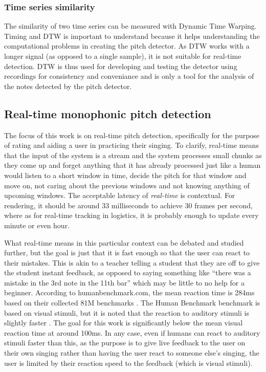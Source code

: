 \subsubsection{Time series similarity}
The similarity of two time series can be measured with Dynamic Time Warping. Timing and DTW is important to understand because it helps understanding the computational problems in creating the pitch detector. As DTW works with a longer signal (as opposed to a single sample), it is not suitable for real-time detection. DTW is thus used for developing and testing the detector using recordings for consistency and conveniance and is only a tool for the analysis of the notes detected by the pitch detector. 

\subsection{Real-time monophonic pitch detection}
The focus of this work is on real-time pitch detection, specifically for the purpose of rating and aiding a user in practicing their singing. To clarify, real-time means that the input of the system is a stream and the system processes small chunks as they come up and forget anything that it has already processed just like a human would listen to a short window in time, decide the pitch for that window and move on, not caring about the previous windows and not knowing anything of upcoming windows. The acceptable latency of \textit{real-time} is contextual. For rendering, it should be around 33 milliseconds to achieve 30 frames per second, where as for real-time tracking in logistics, it is probably enough to update every minute or even hour. 

What real-time means in this particular context can be debated and studied further, but the goal is just that it is fast enough so that the user can react to their mistakes. This is akin to a teacher telling a student that they are off to give the student instant feedback, as opposed to saying something like “there was a mistake in the 3rd note in the 11th bar” which may be little to no help for a beginner. According to humanbenchmark.com, the mean reaction time is 284ms based on their collected 81M benchmarks \cite{HumanBenchmark2025}. The Human Benchmark benchmark is based on visual stimuli, but it is noted that the reaction to auditory stimuli is slightly faster \cite{SheltonKumar2010}. The goal for this work is significantly below the mean visual reaction time at around 100ms. In any case, even if humans can react to auditory stimuli faster than this, as the purpose is to give live feedback to the user on their own singing rather than having the user react to someone else's singing, the user is limited by their reaction speed to the feedback (which is visual stimuli).

